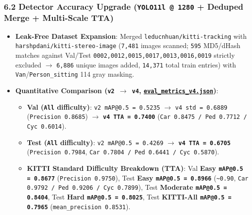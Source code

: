 \documentclass[10.5pt,a4paper]{article}
\begin{document}
\subsubsection{6.2 Detector Accuracy Upgrade (\texttt{YOLO11l @ 1280} + Deduped Merge + Multi-Scale TTA)}
\begin{itemize}[leftmargin=1.5em,itemsep=2pt]
\item \textbf{Leak-Free Dataset Expansion}: Merged \texttt{leducnhuan/\allowbreak{}kitti-\allowbreak{}tracking} with \texttt{harshpdani/\allowbreak{}kitti-\allowbreak{}stereo-\allowbreak{}image} (\texttt{7,\allowbreak{}481} images scanned; \texttt{595} MD5/dHash matches against Val/Test \texttt{0002,\allowbreak{}0012,\allowbreak{}0015,\allowbreak{}0017,\allowbreak{}0013,\allowbreak{}0016,\allowbreak{}0019} strictly excluded $\rightarrow$ \texttt{6,\allowbreak{}886} unique images added, \texttt{14,\allowbreak{}371} total train entries) with \texttt{Van}/\texttt{Person\_\allowbreak{}sitting} 114 gray masking.
\item \textbf{Quantitative Comparison (\texttt{v2 $\rightarrow$ v4}, \href{https://github.com/Heisnotanimposter/Totalcare\_autonomous\_driving\_Yolov5/blob/main/results/v4\_road\_lane/detect\_outputs/outputs/eval\_metrics\_v4.json}{\texttt{eval\_\allowbreak{}metrics\_\allowbreak{}v4.\allowbreak{}json}})}:
\begin{itemize}[leftmargin=1.5em,itemsep=2pt]
\item \textbf{Val (\texttt{All} difficulty)}: \texttt{v2 mAP@0.\allowbreak{}5 = 0.\allowbreak{}5235} $\rightarrow$ \texttt{v4 std = 0.\allowbreak{}6889} (\texttt{Precision 0.\allowbreak{}8685}) $\rightarrow$ \textbf{\texttt{v4 TTA = 0.\allowbreak{}7400}} (\texttt{Car 0.\allowbreak{}8475 /\allowbreak{} Ped 0.\allowbreak{}7712 /\allowbreak{} Cyc 0.\allowbreak{}6014}).
\item \textbf{Test (\texttt{All} difficulty)}: \texttt{v2 mAP@0.\allowbreak{}5 = 0.\allowbreak{}4269} $\rightarrow$ \textbf{\texttt{v4 TTA = 0.\allowbreak{}6705}} (\texttt{Precision 0.\allowbreak{}7984}, \texttt{Car 0.\allowbreak{}7804 /\allowbreak{} Ped 0.\allowbreak{}6441 /\allowbreak{} Cyc 0.\allowbreak{}5870}).
\item \textbf{KITTI Standard Difficulty Breakdown (TTA)}: Val \textbf{Easy \texttt{mAP@0.\allowbreak{}5 = 0.\allowbreak{}8677}} (\texttt{Precision 0.\allowbreak{}9750}), Test \textbf{Easy \texttt{mAP@0.\allowbreak{}5 = 0.\allowbreak{}8966}} (\texttt{\textasciitilde{}0.\allowbreak{}90}, \texttt{Car 0.\allowbreak{}9792 /\allowbreak{} Ped 0.\allowbreak{}9206 /\allowbreak{} Cyc 0.\allowbreak{}7899}), Test \textbf{Moderate \texttt{mAP@0.\allowbreak{}5 = 0.\allowbreak{}8404}}, Test \textbf{Hard \texttt{mAP@0.\allowbreak{}5 = 0.\allowbreak{}8025}}, Test \textbf{KITTI-All \texttt{mAP@0.\allowbreak{}5 = 0.\allowbreak{}7965}} (\texttt{mean\_\allowbreak{}precision 0.\allowbreak{}8531}).

\end{itemize}
\end{itemize}
\end{document}
